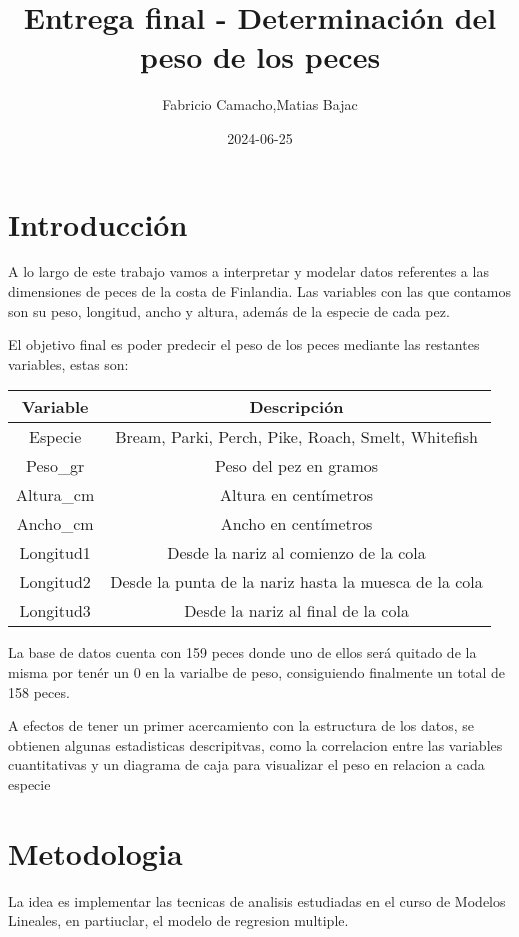 \documentclass[
]{article}
\title{Entrega final - Determinación del peso de los peces}
\author{Fabricio Camacho,Matias Bajac}
\date{2024-06-25}
\begin{document}
\maketitle

\section{Introducción}\label{introducciuxf3n}

A lo largo de este trabajo vamos a interpretar y modelar datos
referentes a las dimensiones de peces de la costa de Finlandia. Las
variables con las que contamos son su peso, longitud, ancho y altura,
además de la especie de cada pez.

El objetivo final es poder predecir el peso de los peces mediante las
restantes variables, estas son:

\begin{longtable}[]{@{}cc@{}}
\toprule\noalign{}
Variable & Descripción \\
\midrule\noalign{}
\endhead
\bottomrule\noalign{}
\endlastfoot
Especie & Bream, Parki, Perch, Pike, Roach, Smelt, Whitefish \\
Peso\_gr & Peso del pez en gramos \\
Altura\_cm & Altura en centímetros \\
Ancho\_cm & Ancho en centímetros \\
Longitud1 & Desde la nariz al comienzo de la cola \\
Longitud2 & Desde la punta de la nariz hasta la muesca de la cola \\
Longitud3 & Desde la nariz al final de la cola \\
\end{longtable}

La base de datos cuenta con 159 peces donde uno de ellos será quitado de
la misma por tenér un 0 en la varialbe de peso, consiguiendo finalmente
un total de 158 peces.

A efectos de tener un primer acercamiento con la estructura de los
datos, se obtienen algunas estadisticas descripitvas, como la
correlacion entre las variables cuantitativas y un diagrama de caja para
visualizar el peso en relacion a cada especie

\section{Metodologia}\label{metodologia}

La idea es implementar las tecnicas de analisis estudiadas en el curso
de Modelos Lineales, en partiuclar, el modelo de regresion multiple.
\end{document}
